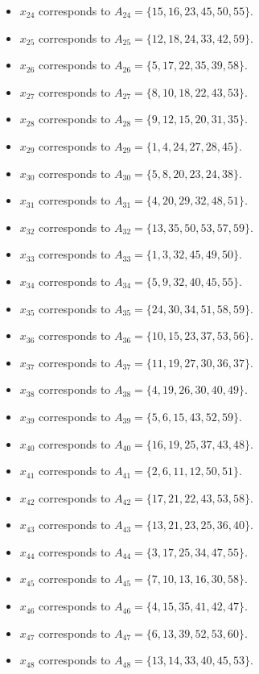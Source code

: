 \documentclass[11pt]{article}
\begin{document}
\begin{itemize}
\item $x_{24}$ corresponds to $A_{24}=\{15, 16, 23, 45, 50, 55\}$.
\item $x_{25}$ corresponds to $A_{25}=\{12, 18, 24, 33, 42, 59\}$.
\item $x_{26}$ corresponds to $A_{26}=\{5, 17, 22, 35, 39, 58\}$.
\item $x_{27}$ corresponds to $A_{27}=\{8, 10, 18, 22, 43, 53\}$.
\item $x_{28}$ corresponds to $A_{28}=\{9, 12, 15, 20, 31, 35\}$.
\item $x_{29}$ corresponds to $A_{29}=\{1, 4, 24, 27, 28, 45\}$.
\item $x_{30}$ corresponds to $A_{30}=\{5, 8, 20, 23, 24, 38\}$.
\item $x_{31}$ corresponds to $A_{31}=\{4, 20, 29, 32, 48, 51\}$.
\item $x_{32}$ corresponds to $A_{32}=\{13, 35, 50, 53, 57, 59\}$.
\item $x_{33}$ corresponds to $A_{33}=\{1, 3, 32, 45, 49, 50\}$.
\item $x_{34}$ corresponds to $A_{34}=\{5, 9, 32, 40, 45, 55\}$.
\item $x_{35}$ corresponds to $A_{35}=\{24, 30, 34, 51, 58, 59\}$.
\item $x_{36}$ corresponds to $A_{36}=\{10, 15, 23, 37, 53, 56\}$.
\item $x_{37}$ corresponds to $A_{37}=\{11, 19, 27, 30, 36, 37\}$.
\item $x_{38}$ corresponds to $A_{38}=\{4, 19, 26, 30, 40, 49\}$.
\item $x_{39}$ corresponds to $A_{39}=\{5, 6, 15, 43, 52, 59\}$.
\item $x_{40}$ corresponds to $A_{40}=\{16, 19, 25, 37, 43, 48\}$.
\item $x_{41}$ corresponds to $A_{41}=\{2, 6, 11, 12, 50, 51\}$.
\item $x_{42}$ corresponds to $A_{42}=\{17, 21, 22, 43, 53, 58\}$.
\item $x_{43}$ corresponds to $A_{43}=\{13, 21, 23, 25, 36, 40\}$.
\item $x_{44}$ corresponds to $A_{44}=\{3, 17, 25, 34, 47, 55\}$.
\item $x_{45}$ corresponds to $A_{45}=\{7, 10, 13, 16, 30, 58\}$.
\item $x_{46}$ corresponds to $A_{46}=\{4, 15, 35, 41, 42, 47\}$.
\item $x_{47}$ corresponds to $A_{47}=\{6, 13, 39, 52, 53, 60\}$.
\item $x_{48}$ corresponds to $A_{48}=\{13, 14, 33, 40, 45, 53\}$.

\end{itemize}
\end{document}
